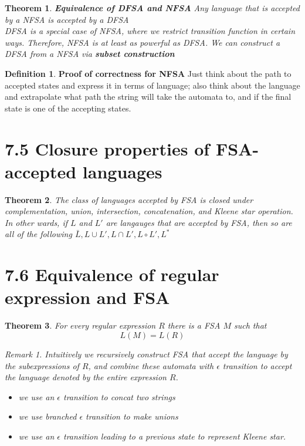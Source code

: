 \documentclass[11pt]{article}
\theoremstyle{plain}%
\newtheorem{theorem}{Theorem}[section]
\theoremstyle{definition}
\newtheorem{defn}{Definition}
\theoremstyle{remark}
\newtheorem*{rem}{Remark}
\begin{document}
\begin{theorem}
  \textbf{Equivalence of DFSA and NFSA}
  Any language that is accepted by a NFSA is accepted by a DFSA\\
  DFSA is a special case of NFSA, where we restrict transition function in certain ways. Therefore, NFSA is at least as powerful as DFSA. We can construct a DFSA from a NFSA via \textbf{subset construction}
\end{theorem}

\begin{defn}
  \textbf{Proof of correctness for NFSA} Just think about the path to accepted states and express it in terms of language; also think about the language and extrapolate what path the string will take the automata to, and if the final state is one of the accepting states.
\end{defn}



\section*{7.5 Closure properties of FSA-accepted languages}

\begin{theorem}
  The class of languages accepted by FSA is closed under complementation, union, intersection, concatenation, and Kleene star operation. In other wards, if $L$ and $L'$ are langauges that are accepted by FSA, then so are all of the following $\bar{L}, L\cup L', L\cap L', L\circ L', L^*$
\end{theorem}


\section*{7.6 Equivalence of regular expression and FSA}

\begin{theorem}
  For every regular expression $R$ there is a FSA $M$ such that
  \[
    L(M) = L(R)
  \]
  \begin{rem}
    Intuitively we recursively construct FSA that accept the language by the subexpressions of $R$,  and combine these automata with $\epsilon$ transition to accept the language denoted by the entire expression $R$.
    \begin{itemize}
      \item we use an $\epsilon$ transition to concat two strings
      \item we use branched $\epsilon$ transition to make unions
      \item we use an $\epsilon$ transition leading to a previous state to represent Kleene star.
    \end{itemize}
  \end{rem}
\end{theorem}
\end{document}
